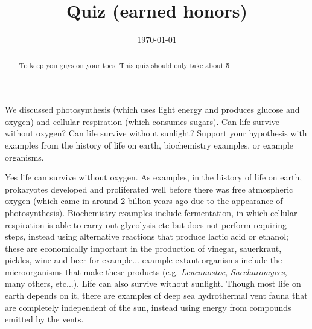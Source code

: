 \documentclass[quiz,addpoints,noanswers]{exam}
\title{Quiz (earned honors)}
\date{\today}
\author{\mobeardInstructorShort}
\begin{document}
\maketitle
\begin{abstract}
To keep you guys on your toes. This quiz should only take about \SI{5}{\min}
\end{abstract}

\begin{questions}
\question[5] We discussed photosynthesis (which uses light energy and produces glucose and oxygen) and cellular respiration (which consumes sugars).  Can life survive without oxygen? Can life survive without sunlight? Support your hypothesis with examples from the history of life on earth, biochemistry examples, or example organisms. 
\begin{solution}[6in]
Yes life can survive without oxygen. As examples, in the history of life on earth, prokaryotes developed and proliferated well before there was free atmospheric oxygen (which came in around 2 billion years ago due to the appearance of photosynthesis). Biochemistry examples include fermentation, in which cellular respiration is able to carry out glycolysis etc but does not perform  requiring steps, instead using alternative reactions that produce lactic acid or ethanol; these are economically important in the production of vinegar, sauerkraut, pickles, wine and beer for example... example extant organisms include the microorganisms that make these products (e.g. \emph{Leuconostoc}, \emph{Saccharomyces}, many others, etc...). Life can also survive without sunlight. Though most life on earth depends on it, there are examples of deep sea hydrothermal vent fauna that are completely independent of the sun, instead using energy from compounds emitted by the vents. 
\end{solution}
\end{questions}
\end{document}
